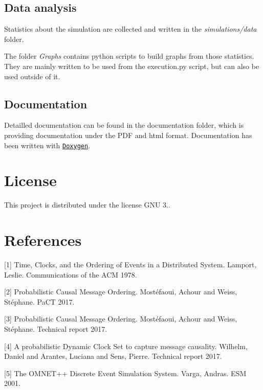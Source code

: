 \subsection*{Data analysis}

Statistics about the simulation are collected and written in the {\itshape simulations/data} folder.

The folder {\itshape Graphs} contains python scripts to build graphs from those statistics. They are mainly written to be used from the \textquotesingle{}execution.\+py\textquotesingle{} script, but can also be used outside of it.

\subsection*{Documentation}

Detailled documentation can be found in the documentation folder, which is providing documentation under the P\+DF and html format. Documentation has been written with \href{https://www.doxygen.nl/}{\tt Doxygen}.

\section*{License}

This project is distributed under the license G\+NU 3..

\section*{References}

\mbox{[}1\mbox{]} Time, Clocks, and the Ordering of Events in a Distributed System. Lamport, Leslie. Communications of the A\+CM 1978.

\mbox{[}2\mbox{]} Probabilistic Causal Message Ordering. Mostéfaoui, Achour and Weiss, Stéphane. Pa\+CT 2017.

\mbox{[}3\mbox{]} Probabilistic Causal Message Ordering. Mostéfaoui, Achour and Weiss, Stéphane. Technical report 2017.

\mbox{[}4\mbox{]} A probabilistic Dynamic Clock Set to capture message causality. Wilhelm, Daniel and Arantes, Luciana and Sens, Pierre. Technical report 2017.

\mbox{[}5\mbox{]} The O\+M\+N\+E\+T++ Discrete Event Simulation System. Varga, Andras. E\+SM 2001. 